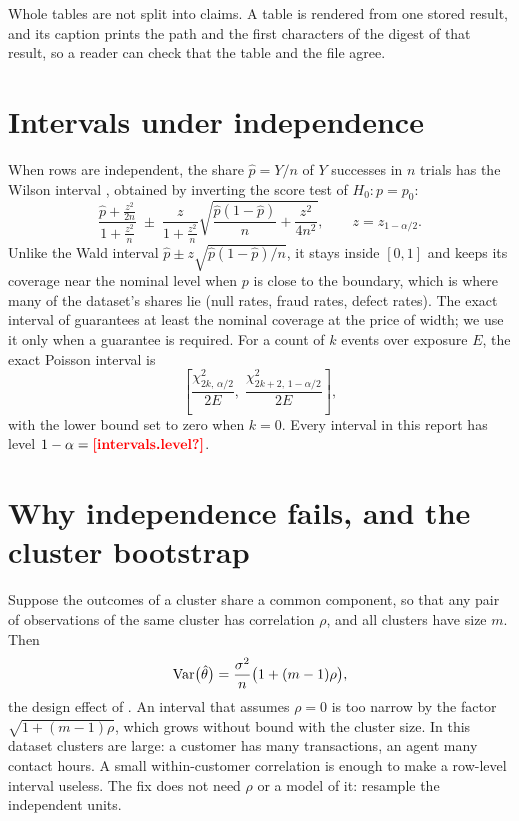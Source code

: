 Whole tables are not split into claims. A table is rendered from one stored result, and its caption prints the path
and the first characters of the \shaname{} digest of that result, so a reader can check that the table and the file
agree.

\section{Intervals under independence}\label{sec:em-iid}

When rows are independent, the share $\hat p = Y/n$ of $Y$ successes in $n$ trials has the Wilson interval
\autocite{wilson1927}, obtained by inverting the score test of $H_0\colon p = p_0$:
\begin{equation}\label{eq:wilson}
  \frac{\hat p + \frac{z^2}{2n}}{1 + \frac{z^2}{n}}
  \;\pm\;
  \frac{z}{1 + \frac{z^2}{n}} \sqrt{\frac{\hat p(1 - \hat p)}{n} + \frac{z^2}{4n^2}},
  \qquad z = z_{1 - \alpha/2}.
\end{equation}
Unlike the Wald interval $\hat p \pm z\sqrt{\hat p(1-\hat p)/n}$, it stays inside $[0, 1]$ and keeps its coverage
near the nominal level when $p$ is close to the boundary, which is where many of the dataset's shares lie (null rates,
fraud rates, defect rates). The exact interval of \textcite{clopper1934} guarantees at least the nominal coverage at
the price of width; we use it only when a guarantee is required. For a count of $k$ events over exposure $E$, the
exact Poisson interval \autocite{garwood1936} is
\begin{equation}\label{eq:garwood}
  \left[\frac{\chi^2_{2k,\,\alpha/2}}{2E},\; \frac{\chi^2_{2k+2,\,1-\alpha/2}}{2E}\right],
\end{equation}
with the lower bound set to zero when $k = 0$. Every interval in this report has level $1 - \alpha =
\proto{intervals.level}$.

\section{Why independence fails, and the cluster bootstrap}\label{sec:em-clusters}

Suppose the outcomes of a cluster share a common component, so that any pair of observations of the same cluster
has correlation $\rho$, and all clusters have size $m$. Then
\begin{equation}\label{eq:deff}
  \operatorname{Var}\bigl(\hat\theta\bigr) = \frac{\sigma^2}{n}\bigl(1 + (m - 1)\rho\bigr),
\end{equation}
the design effect of \textcite{kish1965}. An interval that assumes $\rho = 0$ is too narrow by the factor
$\sqrt{1 + (m-1)\rho}$, which grows without bound with the cluster size. In this dataset clusters are large: a
customer has many transactions, an agent many contact hours. A small within-customer correlation is enough to make a
row-level interval useless. The fix does not need $\rho$ or a model of it: resample the independent units.

